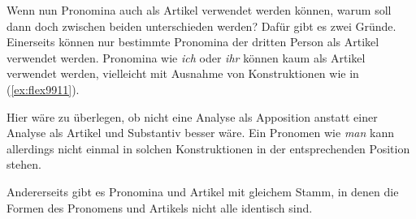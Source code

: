 
Wenn nun Pronomina auch als Artikel verwendet werden können, warum soll dann doch zwischen beiden unterschieden werden?
Dafür gibt es zwei Gründe.
Einerseits können nur bestimmte Pronomina der dritten Person als Artikel verwendet werden.
Pronomina wie \textit{ich} oder \textit{ihr} können \zB kaum als Artikel verwendet werden, vielleicht mit Ausnahme von Konstruktionen wie in (\ref{ex:flex9911}).

\begin{exe}
  \ex\label{ex:flex9911}
  \begin{xlist}
  \end{xlist}
\end{exe}

Hier wäre zu überlegen, ob nicht eine Analyse als Apposition anstatt einer Analyse als Artikel und Substantiv besser wäre.
Ein Pronomen wie \textit{man} kann allerdings nicht einmal in solchen Konstruktionen in der entsprechenden Position stehen.

\newpage

\begin{exe}
  \ex \label{ex:morph7972}
  \begin{xlist}
  \end{xlist}
\end{exe}

Andererseits gibt es Pronomina und Artikel mit gleichem Stamm, in denen die Formen des Pronomens und Artikels nicht alle identisch sind.

\begin{exe}
  \ex \label{ex:flex7973}
  \begin{xlist}
  \end{xlist}
  \ex \label{ex:flex7974}
  \begin{xlist}
  \end{xlist}
  \ex \label{ex:flex7975}
  \begin{xlist}
  \end{xlist}
\end{exe}

